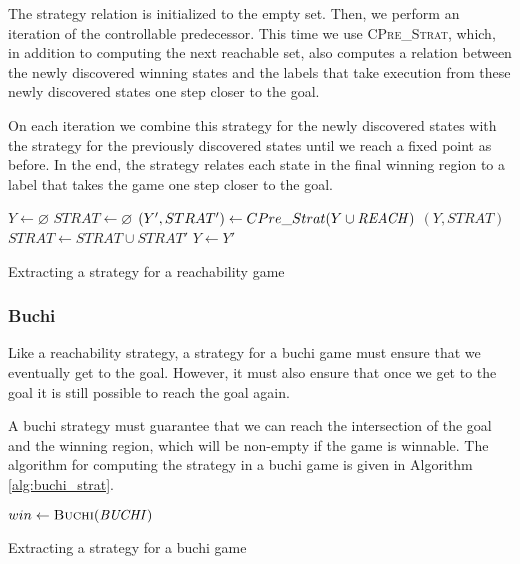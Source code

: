 The strategy relation is initialized to the empty set. Then, we perform an iteration of the controllable predecessor. This time we use \textsc{CPre\_Strat}, which, in addition to computing the next reachable set, also computes a relation between the newly discovered winning states and the labels that take execution from these newly discovered states one step closer to the goal.

On each iteration we combine this strategy for the newly discovered states with the strategy for the previously discovered states until we reach a fixed point as before. In the end, the strategy relates each state in the final winning region to a label that takes the game one step closer to the goal.

\begin{algorithm}[t]
\begin{algorithmic}
\State $Y \gets \varnothing$
\State $STRAT \gets \varnothing$
\Loop
\State $(Y', STRAT') \gets CPre\_Strat(Y \cup \mathit{REACH})$
\State\Return $(Y, STRAT)$\EndIf
\State $STRAT \gets STRAT \cup STRAT'$
\State $Y \gets Y'$
\EndLoop
\EndFunction
\end{algorithmic}
\caption{Extracting a strategy for a reachability game}
\label{alg:reach_strat}
\end{algorithm}

\subsubsection{Buchi}

Like a reachability strategy, a strategy for a buchi game must ensure that we eventually get to the goal. However, it must also ensure that once we get to the goal it is still possible to reach the goal again. 

A buchi strategy must guarantee that we can reach the intersection of the goal and the winning region, which will be non-empty if the game is winnable. The algorithm for computing the strategy in a buchi game is given in Algorithm \ref{alg:buchi_strat}.

\begin{algorithm}[t]
\begin{algorithmic}
\State $win \gets \Call{Buchi}{\buchiobj}$
\State \Return {}
\EndFunction
\end{algorithmic}
\caption{Extracting a strategy for a buchi game}
\label{alg:buchi_strat}
\end{algorithm}

